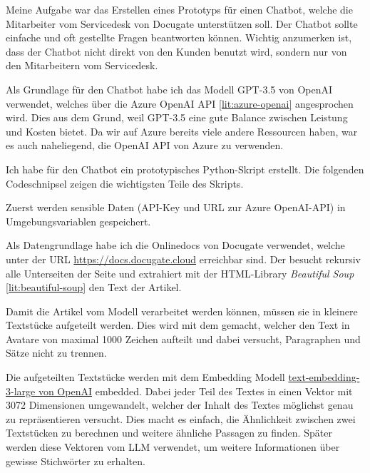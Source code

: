 \documentclass{bpraxis}
\begin{document}
Meine Aufgabe war das Erstellen eines Prototyps für einen Chatbot, welche die Mitarbeiter vom Servicedesk von Docugate unterstützen soll. Der Chatbot sollte einfache und oft gestellte Fragen beantworten können.
Wichtig anzumerken ist, dass der Chatbot nicht direkt von den Kunden benutzt wird, sondern nur von den Mitarbeitern vom Servicedesk.

Als Grundlage für den Chatbot habe ich das Modell GPT-3.5 von OpenAI verwendet, welches über die Azure OpenAI API \ref{lit:azure-openai} angesprochen wird. Dies aus dem Grund, weil GPT-3.5 eine gute Balance zwischen
Leistung und Kosten bietet. Da wir auf Azure bereits viele andere Ressourcen haben, war es auch naheliegend, die OpenAI API von Azure zu verwenden.

Ich habe für den Chatbot ein prototypisches Python-Skript erstellt. Die folgenden Codeschnipsel zeigen die wichtigsten Teile des Skripts.
\\

Zuerst werden sensible Daten (API-Key und URL zur Azure OpenAI-API) in Umgebungsvariablen gespeichert.


Als Datengrundlage habe ich die Onlinedocs von Docugate verwendet, welche unter der URL \href{https://docs.docugate.cloud}{https://docs.docugate.cloud} erreichbar sind.
Der  besucht rekursiv alle Unterseiten der Seite und extrahiert mit der HTML-Library \textit{Beautiful Soup} \ref{lit:beautiful-soup} den Text der Artikel.


Damit die Artikel vom Modell verarbeitet werden können, müssen sie in kleinere Textstücke aufgeteilt werden. Dies wird mit dem  gemacht,
welcher den Text in Avatare von maximal 1000 Zeichen aufteilt und dabei versucht, Paragraphen und Sätze nicht zu trennen.


Die aufgeteilten Textstücke werden mit dem Embedding Modell \href{https://platform.openai.com/docs/guides/embeddings}{text-embedding-3-large von OpenAI} embedded. Dabei jeder Teil des Textes in einen Vektor mit 3072 Dimensionen umgewandelt,
welcher der Inhalt des Textes möglichst genau zu repräsentieren versucht. Dies macht es einfach, die Ähnlichkeit zwischen zwei Textstücken zu berechnen und weitere ähnliche Passagen zu finden.
Später werden diese Vektoren vom LLM verwendet, um weitere Informationen über gewisse Stichwörter zu erhalten.
\end{document}
